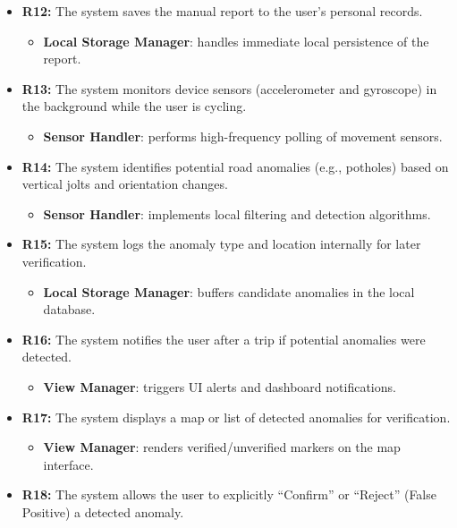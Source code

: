 \begin{itemize}
\begin{itemize}
          \end{itemize}
    \item \textbf{R12:} The system saves the manual report to the user’s personal records.
          \begin{itemize}
              \item \textbf{Local Storage Manager}: handles immediate local persistence of the report.
          \end{itemize}
    \item \textbf{R13:} The system monitors device sensors (accelerometer and gyroscope) in the background while the user is cycling.
          \begin{itemize}
              \item \textbf{Sensor Handler}: performs high-frequency polling of movement sensors.
          \end{itemize}
    \item \textbf{R14:} The system identifies potential road anomalies (e.g., potholes) based on vertical jolts and orientation changes.
          \begin{itemize}
              \item \textbf{Sensor Handler}: implements local filtering and detection algorithms.
          \end{itemize}
    \item \textbf{R15:} The system logs the anomaly type and location internally for later verification.
          \begin{itemize}
              \item \textbf{Local Storage Manager}: buffers candidate anomalies in the local database.
          \end{itemize}
    \item \textbf{R16:} The system notifies the user after a trip if potential anomalies were detected.
          \begin{itemize}
              \item \textbf{View Manager}: triggers UI alerts and dashboard notifications.
          \end{itemize}
    \item \textbf{R17:} The system displays a map or list of detected anomalies for verification.
          \begin{itemize}
              \item \textbf{View Manager}: renders verified/unverified markers on the map interface.
          \end{itemize}
    \item \textbf{R18:} The system allows the user to explicitly “Confirm” or “Reject” (False Positive) a detected anomaly.

\end{itemize}
